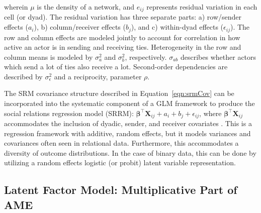 \documentclass[12pt]{amsart}
\begin{document}
wherein $\mu$ is the density of a network, and $e_{ij}$ represents residual variation in each cell (or dyad). The residual variation has three separate parts: a)   row/sender effects ($a_{i}$), b)  column/receiver effects ($b_{j}$), and c) within-dyad effects ($\epsilon_{ij}$). The row and column effects are modeled jointly to account for correlation in how active an actor is in sending and receiving ties. Heterogeneity in the row and column means is modeled by $\sigma_{a}^{2}$ and $\sigma_{b}^{2}$, respectively.  $\sigma_{ab}$ describes whether actors which send a lot of ties also receive a lot. Second-order dependencies are described by $\sigma_{\epsilon}^{2}$ and a reciprocity, parameter $\rho$. 

The SRM covariance structure described in Equation~\ref{eqn:srmCov} can be incorporated into the systematic component of a GLM framework to produce the social relations regression model (SRRM): $\bm\beta^{\top} \mathbf{X}_{ij} + a_{i} + b_{j} + \epsilon_{ij}$, where $ \bm\beta^{\top} \mathbf{X}_{ij}$ accommodates the inclusion of dyadic, sender, and receiver covariates \citep{hoff:2005}. This is a regression framework with additive, random effects, but it models variances and covariances often seen in relational data. Furthermore, this accommodates a diversity of outcome distributions. In the case of binary data, this can be done by utilizing a random effects logistic (or probit) latent variable representation. 


\subsection{\textbf{Latent Factor Model: Multiplicative Part of AME}}
\end{document}

